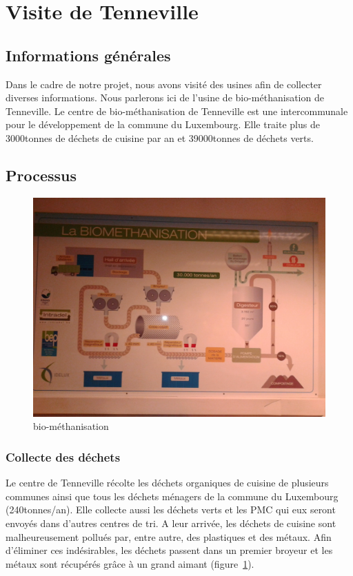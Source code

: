 \section{Visite de Tenneville}
\subsection{Informations générales}
Dans le cadre de notre projet, nous avons visité des usines afin de collecter diverses informations.
Nous parlerons ici de l'usine de bio-méthanisation de Tenneville.
Le centre de bio-méthanisation de Tenneville est une intercommunale pour le développement de la commune du Luxembourg.
Elle traite plus de \unit{3000}{tonnes} de déchets de cuisine par an et \unit{39000}{tonnes} de déchets verts.
\subsection{Processus}
\begin{figure}
  \centering
  \includegraphics[scale=0.07]{task7/tenneville/IMG_20141105_105627.jpg}
  \caption{bio-méthanisation}
  \label{fig:biomethanisation}
\end{figure}
\subsubsection{Collecte des déchets}
Le centre de Tenneville récolte les déchets organiques de cuisine de plusieurs communes ainsi que tous les déchets ménagers de la commune du Luxembourg (\unit{240}{tonnes/an}). Elle collecte aussi les déchets verts et les PMC qui eux seront envoyés dans d'autres centres de tri.
A leur arrivée, les déchets de cuisine sont malheureusement pollués par, entre autre, des plastiques  et des métaux. Afin d'éliminer ces indésirables, les déchets passent dans un premier broyeur et les métaux sont récupérés grâce à un grand aimant (figure~\ref{fig:biomethanisation}). 
